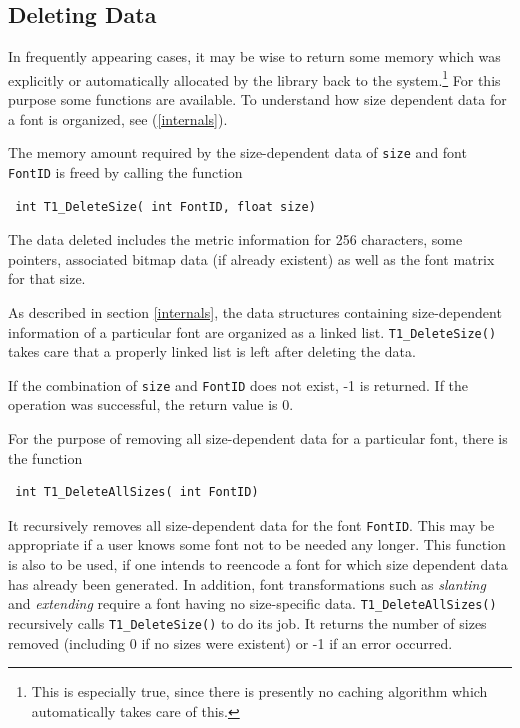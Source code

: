 \subsection{Deleting Data}
\label{deletingdata}%
In frequently appearing cases, it may be wise to return some memory
which was explicitly 
or automatically allocated by the library back to the
system.\footnote{This is especially true, since there is presently no
  caching algorithm which automatically takes care of this.} For
this purpose 
some functions are available. To understand how size dependent
data for a font is organized, see (\ref{internals}).

The memory amount required by the size-dependent data of \verb+size+
and font \verb+FontID+ is freed by calling the function 
\precorr
\begin{verbatim}
 int T1_DeleteSize( int FontID, float size)
\end{verbatim}\postcorr
The data deleted includes the metric
information for 256 characters, some pointers, associated bitmap data (if
already existent) as well as the font matrix for that size.

As described in section \ref{internals}, the data structures containing
size-dependent information of a particular font are organized as a
linked list. \verb+T1_DeleteSize()+ takes care that a properly linked
list is left after deleting the data.

If the combination of \verb+size+ and \verb+FontID+ does not exist, -1
is returned. If the operation was successful, the return value is 0.

For the purpose of removing all size-dependent data for a particular
font, there is the function
\precorr
\begin{verbatim}
 int T1_DeleteAllSizes( int FontID)
\end{verbatim}\postcorr
It recursively removes all size-dependent data for the font
\verb+FontID+. This may be appropriate if a user knows some font not
to be needed any longer. This function is also to be used, if one intends to
reencode a font for 
which size dependent data has already been generated. In addition,
 font transformations
such as {\em slanting} and {\em extending} 
require a font having no size-specific data. 
\verb+T1_DeleteAllSizes()+ recursively calls \verb+T1_DeleteSize()+ to
do its job.
It returns the number of sizes removed (including 0 if no sizes were
existent) or -1 if an error occurred.

